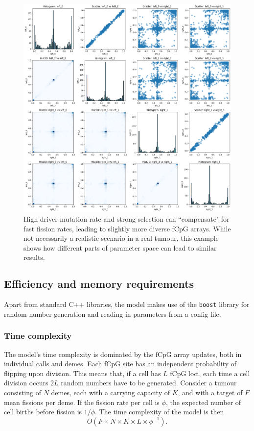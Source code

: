 \begin{figure}[h]
    \centering
    \includegraphics[width=\textwidth]{Chapter_4/figures/inter-gland-sens/comp-plot.png}
    \caption{High driver mutation rate and strong selection can ``compensate" for
    fast fission rates, leading to slightly more diverse fCpG arrays. While not
    necessarily a realistic scenario in a real tumour, this example shows how
    different parts of parameter space can lead to similar results.}
    \label{fig:inter-comp}
\end{figure}
\clearpage

\subsection{Efficiency and memory requirements}
Apart from standard C++ libraries, the model makes use of the \texttt{boost}
library for random number generation and reading in parameters from a config
file.
\subsubsection{Time complexity}\label{section:time_complexity}
The model's time complexity is dominated by the fCpG array updates, both in
individual calls and demes. Each fCpG site has an independent probability of
flipping upon division. This means that, if a cell has $L$ fCpG loci, each time
a cell division occurs $2L$ random numbers have to be generated. Consider a
tumour consisting of $N$ demes, each with a carrying capacity of $K$, and with a
target of $F$ mean fissions per deme. If the fission rate per cell is $\phi$, the
expected number of cell births before fission is $1/\phi$.
The time complexity of the model is then
\begin{equation}
    O(F\times N\times K\times L\times\phi^{-1}).
\end{equation}

